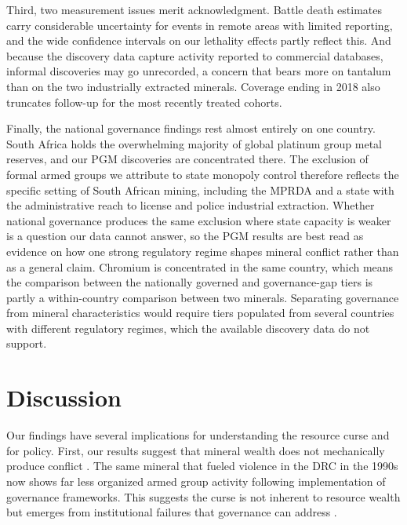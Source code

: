 \documentclass[11pt]{article}
\begin{document}
Third, two measurement issues merit acknowledgment. Battle death estimates carry considerable uncertainty for events in remote areas with limited reporting, and the wide confidence intervals on our lethality effects partly reflect this. And because the discovery data capture activity reported to commercial databases, informal discoveries may go unrecorded, a concern that bears more on tantalum than on the two industrially extracted minerals. Coverage ending in 2018 also truncates follow-up for the most recently treated cohorts.

Finally, the national governance findings rest almost entirely on one country. South Africa holds the overwhelming majority of global platinum group metal reserves, and our PGM discoveries are concentrated there. The exclusion of formal armed groups we attribute to state monopoly control therefore reflects the specific setting of South African mining, including the MPRDA and a state with the administrative reach to license and police industrial extraction. Whether national governance produces the same exclusion where state capacity is weaker is a question our data cannot answer, so the PGM results are best read as evidence on how one strong regulatory regime shapes mineral conflict rather than as a general claim. Chromium is concentrated in the same country, which means the comparison between the nationally governed and governance-gap tiers is partly a within-country comparison between two minerals. Separating governance from mineral characteristics would require tiers populated from several countries with different regulatory regimes, which the available discovery data do not support.


\section{Discussion}
\label{sec:discussion}

Our findings have several implications for understanding the resource curse and for policy. First, our results suggest that mineral wealth does not mechanically produce conflict \citep{ross2015resource, gilmore2005resource}. The same mineral that fueled violence in the DRC in the 1990s now shows far less organized armed group activity following implementation of governance frameworks. This suggests the curse is not inherent to resource wealth but emerges from institutional failures that governance can address \citep{mehlum2006institutions, robinson2006governance}.
\end{document}
